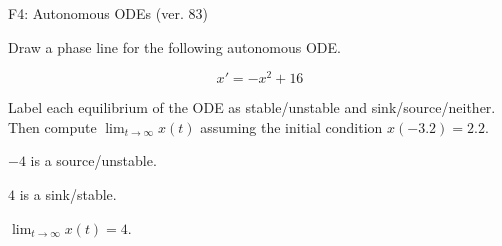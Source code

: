 \begin{exercise}
  \begin{exerciseTitle}F4: Autonomous ODEs (ver. 83)\end{exerciseTitle}
  \begin{exerciseStatement}
    

      Draw a phase line for the following 
      autonomous ODE.
    

    
\[x'= -x^{2} + 16\]

    

      Label each equilibrium of the ODE
      as stable/unstable and sink/source/neither.
      Then compute \(\lim_{t\to\infty}x(t)\)
      assuming the initial condition
      \(x( -3.2 )= 2.2\).
    

  \end{exerciseStatement}
  \begin{exerciseAnswer}
    

      \(-4\) is a source/unstable.
      
      \(4\) is a sink/stable.
    

    

      \(\lim_{t\to\infty}x(t)=4\).
    

  \end{exerciseAnswer}
\end{exercise}